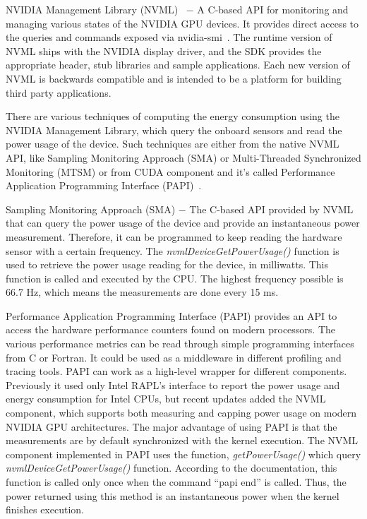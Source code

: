 NVIDIA Management Library (NVML)~\cite{NVML} $-$ A C-based API
for monitoring and managing various states of the NVIDIA GPU
devices. It provides direct access to the queries and commands
exposed via nvidia-smi~\cite{NVIDIA_SMI}.
The runtime version of NVML ships
with the NVIDIA display driver, and the SDK provides the
appropriate header, stub libraries and sample applications.
Each new version of NVML is backwards compatible and is intended
to be a platform for building third party applications.

There are various techniques of computing the energy consumption
using the NVIDIA Management Library, which query the onboard
sensors and read the power usage of the device. Such techniques
are either from the native NVML API, like Sampling Monitoring
Approach (SMA) or Multi-Threaded Synchronized Monitoring (MTSM)
or from CUDA component and it's called Performance Application
Programming Interface (PAPI)~\cite{PAPI_CUDA}.

Sampling Monitoring Approach (SMA) $-$ The C-based API provided
by NVML that can query the power usage of the device and provide
an instantaneous power measurement. Therefore, it can be
programmed to keep reading the hardware sensor with a certain
frequency. The \emph{nvmlDeviceGetPowerUsage()} function is
used to retrieve the power usage reading for the device, in
milliwatts. This function is called and executed by the CPU\@.
The highest frequency possible is 66.7 Hz, which means the
measurements are done every 15 ms.

Performance Application Programming Interface (PAPI) provides
an API to access the hardware performance counters found on
modern processors. The various performance metrics can be read
through simple programming interfaces from C or Fortran. It
could be used as a middleware in different profiling and tracing
tools. PAPI can work as a high-level wrapper for different
components. Previously it used only Intel RAPL's interface to
report the power usage and energy consumption for Intel CPUs,
but recent updates added the NVML component, which supports
both measuring and capping power usage on modern NVIDIA GPU
architectures. The major advantage of using PAPI is that the
measurements are by default synchronized with the kernel execution.
The NVML component implemented in PAPI uses the function,
\emph{getPowerUsage()} which query \emph{nvmlDeviceGetPowerUsage()}
function. According to the documentation, this function is called
only once when the command “papi end” is called. Thus, the power
returned using this method is an instantaneous power when the
kernel finishes execution.

